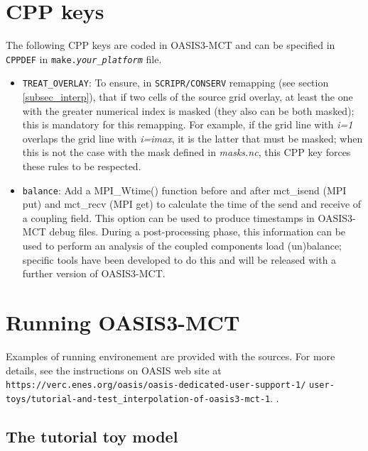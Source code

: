 \section{CPP keys}
\label{subsec_cpp}

The following CPP keys are coded in OASIS3-MCT and can be specified in
{\tt CPPDEF} in {\tt make.{\it your\_platform}} file.

\begin{itemize}

\item {\tt TREAT\_OVERLAY}: To ensure, in {\tt SCRIPR/CONSERV}
  remapping (see section \ref{subsec_interp}), that if two cells of
  the source grid overlay, at least the one with the greater numerical
  index is masked (they also can be both masked); this is mandatory
  for this remapping. For example, if the grid line with {\it i=1} overlaps
  the grid line with {\it i=imax}, it is the latter that must be masked;
  when this is not the case with the mask defined in {\it masks.nc},
  this CPP key forces these rules to be respected.

\item {\tt balance}: Add a MPI\_Wtime() function before and after
  mct\_isend (MPI put) and mct\_recv (MPI get) to calculate the time
  of the send and receive of a coupling field. This option can be used
  to produce timestamps in OASIS3-MCT debug files. During a post-processing
  phase, this information can be used to perform an analysis of the
  coupled components load (un)balance; specific tools have been
  developed to do this and will be released with a further version of
  OASIS3-MCT.

\end{itemize}

\section{Running OASIS3-MCT}
\label{subsec_running}

Examples of running environement are provided with the sources. For
more details, see the instructions on OASIS web site at
{\tt https://verc.enes.org/oasis/oasis-dedicated-user-support-1/} {\tt user-toys/tutorial-and-test\_interpolation-of-oasis3-mct-1}.
.

\subsection{The tutorial toy model}
\label{subsec_tutorial}

